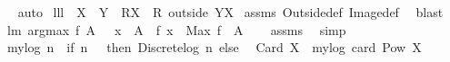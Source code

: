 \begin{isabellebody}
\isadelimproof
\ %
\endisadelimproof
%
\isatagproof
{}\isamarkupfalse%
\ auto%
\endisatagproof
{\isafoldproof}%
%
\isadelimproof
%
\endisadelimproof
\isanewline
\isanewline
{}\isamarkupfalse%
\ lll{}{}{\isacharcolon}\ \ {\isachardoublequoteopen}X\ {\isasyminter}\ Y{\isacharequal}{\isacharbraceleft}{\isacharbraceright}{\isachardoublequoteclose}\ \ {\isachardoublequoteopen}R{\isacharbackquote}{\isacharbackquote}X\ {\isacharequal}\ {\isacharparenleft}R\ outside\ Y{\isacharparenright}{\isacharbackquote}{\isacharbackquote}X{\isachardoublequoteclose}\isanewline
%
\isadelimproof
%
\endisadelimproof
%
\isatagproof
{}\isamarkupfalse%
\ assms\ Outside{\isacharunderscore}def\ Image{\isacharunderscore}def\ \isamarkupfalse%
\ blast%
\endisatagproof
{\isafoldproof}%
%
\isadelimproof
\isanewline
%
\endisadelimproof
\isanewline
{}\isamarkupfalse%
\ lm{}{}{\isacharcolon}\ {\isachardoublequoteopen}argmax\ f\ A\ {\isacharequal}\ {\isacharbraceleft}\ x\ {\isasymin}\ A\ {\isachardot}\ f\ x\ {\isacharequal}\ Max\ {\isacharparenleft}f\ {\isacharbackquote}\ A{\isacharparenright}\ {\isacharbraceright}{\isachardoublequoteclose}%
\isadelimproof
\ %
\endisadelimproof
%
\isatagproof
{}\isamarkupfalse%
\ assms\ \isamarkupfalse%
\ simp%
\endisatagproof
{\isafoldproof}%
%
\isadelimproof
%
\endisadelimproof
\isanewline
\isanewline
\isanewline
\isanewline
\isanewline
\isanewline
\isanewline
\isanewline
\isanewline
\isanewline
\isanewline
\isanewline
\isanewline
\isanewline
\isanewline
\isanewline
\isanewline
\isanewline
\isanewline
\isanewline
\isanewline
\isanewline
\isanewline
\isanewline
\isanewline
\isanewline
\isanewline
\isanewline
\isanewline
\isanewline
\isanewline
\isanewline
\isanewline
\isanewline
\isanewline
\isanewline
\isanewline
\isanewline
\isanewline
\isanewline
\isanewline
\isanewline
\isanewline
\isanewline
\isanewline
\isanewline
\isanewline
\isanewline
\isanewline
\isanewline
\isanewline
\isanewline
\isanewline
\isanewline
{}\isamarkupfalse%
\ {\isachardoublequoteopen}mylog\ n\ {\isacharequal}{\isacharequal}\ {\isacharparenleft}if\ {\isacharparenleft}n\ {\isasymnoteq}\ {}{\isacharparenright}\ then\ {\isacharparenleft}Discrete{\isachardot}log\ n{\isacharparenright}\ else\ {\isacharparenleft}{\isacharminus}{}{\isacharparenright}{\isacharparenright}{\isachardoublequoteclose}\isanewline
{}\isamarkupfalse%
\ {\isachardoublequoteopen}Card\ X\ {\isacharequal}{\isacharequal}\ mylog\ {\isacharparenleft}card\ {\isacharparenleft}Pow\ X{\isacharparenright}{\isacharparenright}{\isachardoublequoteclose}\isanewline

\end{isabellebody}
